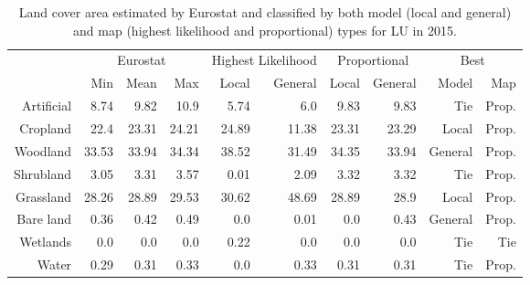 \begin{table}[H]
\centering
\caption{Land cover area estimated by Eurostat and classified by both model (local and general) and map (highest likelihood and proportional) types for LU in 2015.}

\begin{tabular}{r|rrr|rr|rr|rr}
\toprule
{} & \multicolumn{3}{|c}{Eurostat} & \multicolumn{2}{|c}{Highest Likelihood} & \multicolumn{2}{|c}{Proportional} & \multicolumn{2}{|c}{Best} \\
{} &      Min &   Mean &    Max &              Local & General &        Local & General &    Model &    Map \\
\midrule
Artificial &     8.74 &   9.82 &   10.9 &               5.74 &     6.0 &         9.83 &    9.83 &      Tie &  Prop. \\
Cropland   &     22.4 &  23.31 &  24.21 &              24.89 &   11.38 &        23.31 &   23.29 &    Local &  Prop. \\
Woodland   &    33.53 &  33.94 &  34.34 &              38.52 &   31.49 &        34.35 &   33.94 &  General &  Prop. \\
Shrubland  &     3.05 &   3.31 &   3.57 &               0.01 &    2.09 &         3.32 &    3.32 &      Tie &  Prop. \\
Grassland  &    28.26 &  28.89 &  29.53 &              30.62 &   48.69 &        28.89 &    28.9 &    Local &  Prop. \\
Bare land  &     0.36 &   0.42 &   0.49 &                0.0 &    0.01 &          0.0 &    0.43 &  General &  Prop. \\
Wetlands   &      0.0 &    0.0 &    0.0 &               0.22 &     0.0 &          0.0 &     0.0 &      Tie &    Tie \\
Water      &     0.29 &   0.31 &   0.33 &                0.0 &    0.33 &         0.31 &    0.31 &      Tie &  Prop. \\
\bottomrule
\end{tabular}
\end{table}

